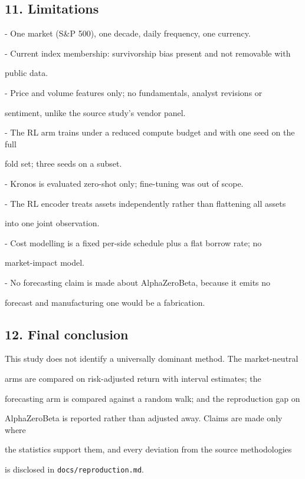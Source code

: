 \subsection*{11. Limitations}

- One market (S\&P 500), one decade, daily frequency, one currency.\par
- Current index membership: survivorship bias present and not removable with\par
  public data.\par
- Price and volume features only; no fundamentals, analyst revisions or\par
  sentiment, unlike the source study's vendor panel.\par
- The RL arm trains under a reduced compute budget and with one seed on the full\par
  fold set; three seeds on a subset.\par
- Kronos is evaluated zero-shot only; fine-tuning was out of scope.\par
- The RL encoder treats assets independently rather than flattening all assets\par
  into one joint observation.\par
- Cost modelling is a fixed per-side schedule plus a flat borrow rate; no\par
  market-impact model.\par
- No forecasting claim is made about AlphaZeroBeta, because it emits no\par
  forecast and manufacturing one would be a fabrication.\par

\subsection*{12. Final conclusion}

This study does not identify a universally dominant method. The market-neutral\par
arms are compared on risk-adjusted return with interval estimates; the\par
forecasting arm is compared against a random walk; and the reproduction gap on\par
AlphaZeroBeta is reported rather than adjusted away. Claims are made only where\par
the statistics support them, and every deviation from the source methodologies\par
is disclosed in \texttt{docs/reproduction.md}.\par

